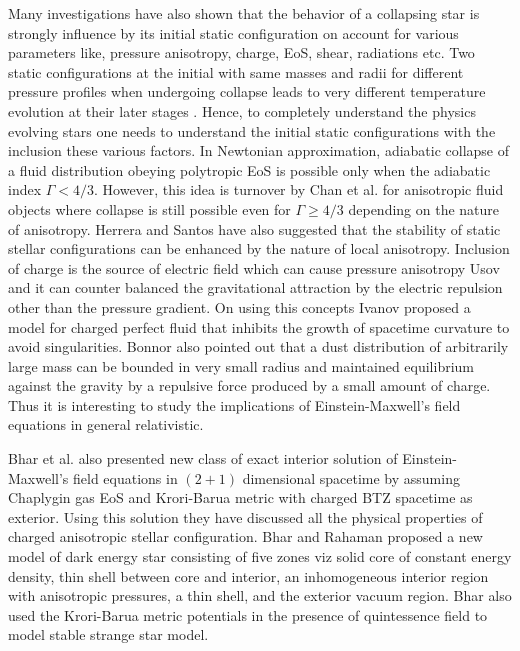 \documentclass[preprintnumbers,amsmath,amssymb,floatfix,9pt,prd,twocolumn,
superscriptaddress,nofootinbib]{revtex4}
\begin{document}
Many investigations have also shown that the behavior of a collapsing star is strongly influence by its initial static configuration on account for various parameters like, pressure anisotropy, charge, EoS, shear, radiations etc. Two static configurations at the initial with same masses and radii for different pressure profiles when undergoing collapse leads to very different temperature evolution at their later stages \cite{nai}. Hence, to completely understand the physics evolving stars one needs to understand the initial static configurations with the inclusion these various factors.  In Newtonian  approximation, adiabatic collapse of a fluid distribution obeying polytropic EoS is possible only when the adiabatic index $\Gamma < 4/3$. However, this idea is turnover by Chan et al. \cite{chan} for anisotropic fluid objects where collapse is still possible even for $\Gamma \ge 4/3$ depending on the nature of anisotropy. Herrera and Santos \cite{her1} have also suggested that the stability of static stellar configurations can be enhanced by the nature of local anisotropy. Inclusion of charge is the source of electric field which can cause pressure anisotropy Usov \cite{uso} and it can counter balanced the gravitational attraction by the electric repulsion other than the pressure gradient. On using this concepts Ivanov \cite{iva} proposed a model for charged perfect fluid that inhibits the growth of spacetime curvature to avoid singularities. Bonnor \cite{bon} also pointed out that a dust distribution of arbitrarily large mass can be  bounded in very small radius and maintained equilibrium against the gravity by a repulsive force produced by a small amount of charge. Thus it is interesting to study the implications of Einstein-Maxwell's field equations in general relativistic.\par
Bhar et al. \cite{bhar1} also presented new class of exact interior solution of Einstein-Maxwell's field equations in $(2 + 1)$ dimensional spacetime by assuming Chaplygin gas EoS and Krori-Barua metric with charged BTZ spacetime as exterior. Using this solution they have discussed all the physical properties of charged anisotropic stellar configuration. Bhar and Rahaman \cite{bhar2} proposed a new model of dark energy star consisting of five zones viz solid core of constant energy density, thin shell between core and interior, an inhomogeneous interior region with anisotropic pressures, a thin shell, and the exterior vacuum region. Bhar \cite{bhar3} also used the Krori-Barua metric potentials in the presence of quintessence field to model stable strange star model.\par
\end{document}
